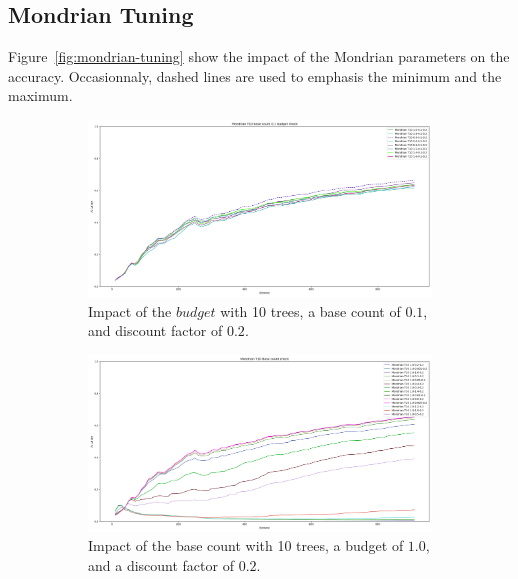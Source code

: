 \subsection{Mondrian Tuning}
Figure~\ref{fig:mondrian-tuning} show the impact of the Mondrian parameters on
the accuracy. Occasionnaly, dashed lines are used to emphasis the minimum and
the maximum.
\begin{figure}
     \centering
     \begin{subfigure}[b]{0.49\textwidth}
         \centering
         \includegraphics[width=\textwidth]{figures/Banos_S1_shuf_Mondrian_T10_bc_0.1_budget_check.png}
         \caption{Impact of the $budget$ with 10 trees, a base count of $0.1$, and discount factor of $0.2$.}
     \end{subfigure}
     \hfill
     \begin{subfigure}[b]{0.49\textwidth}
         \centering
         \includegraphics[width=\textwidth]{figures/Banos_S1_shuf_Mondrian_T10_check.png}
         \caption{Impact of the base count with 10 trees, a budget of $1.0$, and a discount factor of $0.2$.}
     \end{subfigure}
     \hfill
     \begin{subfigure}[b]{0.49\textwidth}

\end{subfigure}
\end{figure}
